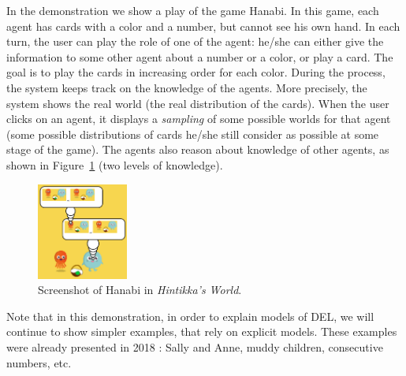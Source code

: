 
In the demonstration we show a play of the game Hanabi. 
In this game, each agent has cards with a color and a
number, but cannot see his own hand.
In each turn, the user can play the role of one of the agent: he/she can either give the information to some other agent about a number or a color, or play a card. The goal is to play the cards in increasing order for each color.
During the process, the system keeps track on the knowledge of the agents.
More precisely, the system shows the real world (the real distribution of the cards). When the user clicks on an agent, it displays a \emph{sampling} of some possible worlds for that agent (some possible distributions of cards he/she still consider as possible at some stage of the game). The agents also reason about knowledge of other agents, as shown in Figure~\ref{figure:guihanabi} (two levels of knowledge).
%
%
%


\begin{figure}
	\begin{center}
		\includegraphics[width=3cm]{images/screenshot.png}
	\end{center}
	\caption{Screenshot of Hanabi in \emph{Hintikka's World}.\label{figure:guihanabi}}
\end{figure}

Note that in this demonstration, in order to explain models of DEL, we will continue to show simpler examples, that rely on explicit models. These examples were already presented in 2018 \cite{DBLP:conf/ijcai/Schwarzentruber18}: Sally and Anne, muddy children, consecutive numbers, etc.